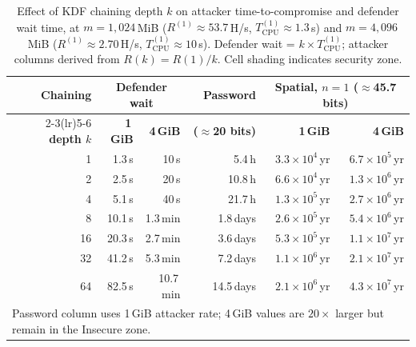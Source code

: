 \documentclass[journal,article,submit,pdftex,moreauthors]{Definitions/mdpi}
\newcommand{\add}[1]{#1}
\newcommand{\add}[1]{\added{#1}}
\begin{document}
\begin{table}[H]
\caption{\add{Effect of KDF chaining depth $k$ on attacker time-to-compromise and defender wait time, at $m=1{,}024$\,MiB ($R^{(1)}\approx53.7$\,H/s, $T_\text{CPU}^{(1)}\approx1.3$\,s) and $m=4{,}096$\,MiB ($R^{(1)}\approx2.70$\,H/s, $T_\text{CPU}^{(1)}\approx10$\,s). Defender wait = $k\times T_\text{CPU}^{(1)}$; attacker columns derived from $R(k)=R(1)/k$. Cell shading indicates security zone.}}
\label{tab:k_chaining_effect}
\centering
\begin{tabular}{rrrrrr}
\toprule
\textbf{Chaining} & \multicolumn{2}{c}{\textbf{Defender wait}} & \textbf{Password} & \multicolumn{2}{c}{\textbf{Spatial, $n=1$ ($\approx$45.7 bits)}} \\
\cmidrule(lr){2-3}\cmidrule(lr){5-6}
\textbf{depth $k$} & \textbf{1\,GiB} & \textbf{4\,GiB} & \textbf{($\approx$20 bits)} & \textbf{1\,GiB} & \textbf{4\,GiB} \\
\midrule
 1 &  1.3\,s &  10\,s & \cellcolor{insecure}5.4\,h    & \cellcolor{humanscale}$3.3\times10^{4}$\,yr & \cellcolor{humanscale}$6.7\times10^{5}$\,yr \\
 2 &  2.5\,s &  20\,s & \cellcolor{insecure}10.8\,h   & \cellcolor{humanscale}$6.6\times10^{4}$\,yr & \cellcolor{humanscale}$1.3\times10^{6}$\,yr \\
 4 &  5.1\,s &  40\,s & \cellcolor{insecure}21.7\,h   & \cellcolor{humanscale}$1.3\times10^{5}$\,yr & \cellcolor{humanscale}$2.7\times10^{6}$\,yr \\
 8 & 10.1\,s & 1.3\,min & \cellcolor{insecure}1.8\,days  & \cellcolor{humanscale}$2.6\times10^{5}$\,yr & \cellcolor{humanscale}$5.4\times10^{6}$\,yr \\
16 & 20.3\,s & 2.7\,min & \cellcolor{insecure}3.6\,days  & \cellcolor{humanscale}$5.3\times10^{5}$\,yr & \cellcolor{humanscale}$1.1\times10^{7}$\,yr \\
32 & 41.2\,s & 5.3\,min & \cellcolor{insecure}7.2\,days  & \cellcolor{humanscale}$1.1\times10^{6}$\,yr & \cellcolor{humanscale}$2.1\times10^{7}$\,yr \\
64 & 82.5\,s & 10.7\,min & \cellcolor{insecure}14.5\,days & \cellcolor{humanscale}$2.1\times10^{6}$\,yr & \cellcolor{humanscale}$4.3\times10^{7}$\,yr \\
\bottomrule
\multicolumn{6}{l}{\footnotesize Password column uses 1\,GiB attacker rate; 4\,GiB values are $20\times$ larger but remain in the Insecure zone.}
\end{tabular}
\end{table}
\end{document}
